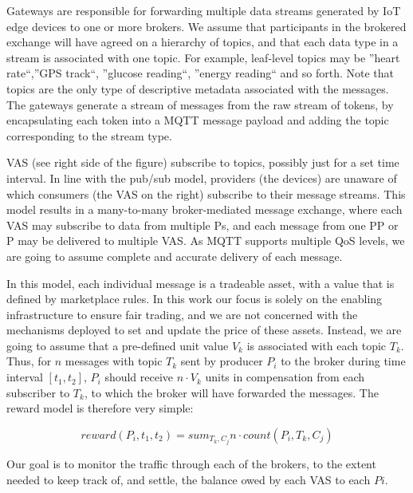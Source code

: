 \documentclass[conference]{IEEEtran}
\begin{document}
Gateways are responsible for forwarding multiple data streams generated by IoT edge devices to one or more brokers.
We assume that participants in the brokered exchange will have agreed on a hierarchy of topics, and that each data type in a stream is associated with one topic. For example, leaf-level topics may be ''heart rate``,''GPS track``, ''glucose reading``, ''energy reading`` and so forth. Note that topics are the only type of descriptive metadata associated with the messages.
The gateways generate a stream of messages from the raw stream of tokens, by encapsulating each token into a MQTT message payload and adding the topic corresponding to the stream type.

VAS (see right side of the figure) subscribe to topics, possibly just for a set time interval. 
In line with the pub/sub model, providers (the devices) are unaware of which consumers (the VAS on the right) subscribe to their message streams.
This model results in a many-to-many broker-mediated message exchange, where each VAS may subscribe to data from multiple Ps, and each message from one PP or P may be delivered to multiple VAS. As MQTT supports multiple QoS levels, we are going to assume complete and accurate delivery of each message.

In this model, each individual message is a tradeable asset, with a value that is defined by marketplace rules. In this work our focus is solely on the enabling infrastructure to ensure fair trading, and we are not concerned with the mechanisms deployed to set and update the price of these assets. Instead, we are going to assume that a pre-defined unit value $ V_k $ is associated with each topic $ T_k $. Thus, for $ n $ messages with topic $ T_k $ sent by producer $ P_i $ to the broker during time interval $ [t_1, t_2] $, $ P_i $ should receive $ n \cdot V_k $ units in compensation from each subscriber to $ T_k $, to which the broker will have forwarded the messages. 
The reward model is therefore very simple:

\begin{equation}
 \mathit{reward}(P_i, t_1, t_2) = sum_{T_k, C_j} n \cdot \mathit{count}(P_i, T_k, C_j)   
\label{eq:reward}
 \end{equation}
 

Our goal is to monitor the traffic through each of the brokers, to the extent needed to keep track of, and settle, the balance owed by each VAS to each $ Pi $.
\end{document}
